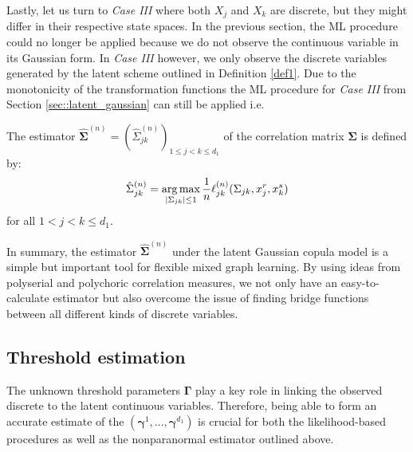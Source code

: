 Lastly, let us turn to \textit{Case III} where both $X_j$ and $X_k$ are discrete, but they might differ in their respective state spaces. In the previous section, the ML procedure could no longer be applied because we do not observe the continuous variable in its Gaussian form. In \textit{Case III} however, we only observe the discrete variables generated by the latent scheme outlined in Definition \ref{def1}. Due to the monotonicity of the transformation functions the ML procedure for \textit{Case III} from Section \ref{sec::latent_gaussian} can still be applied i.e.

\begin{definition}
    The estimator $\hat{\mathbf{\Sigma}}^{(n)} = (\hat{\Sigma}_{jk}^{(n)})_{1\leq j < k\leq d_1}$ of the correlation matrix $\mathbf{\Sigma}$ is defined by:
    \begin{equation}
            \hat{\Sigma}_{jk}^{(n)} = \argmax_{\Abs{\Sigma_{jk}} \leq 1} \frac{1}{n} \ell_{jk}^{(n)}(\Sigma_{jk}, x_j^r,x_k^s)
    \end{equation}
    for all $1 < j < k \leq d_1 $.
\end{definition}

In summary, the estimator $\hat{\mathbf{\Sigma}}^{(n)}$ under the latent Gaussian copula model is a simple but important tool for flexible mixed graph learning. By using ideas from polyserial and polychoric correlation measures, we not only have an easy-to-calculate estimator but also overcome the issue of finding bridge functions between all different kinds of discrete variables.

\subsection{Threshold estimation}\label{sec::thresholds}

The unknown threshold parameters $\mathbf{\Gamma}$ play a key role in linking the observed discrete to the latent continuous variables. Therefore, being able to form an accurate estimate of the $(\mathbf{\gamma}^1, \dots, \mathbf{\gamma}^{d_1})$ is crucial for both the likelihood-based procedures as well as the nonparanormal estimator outlined above. 

